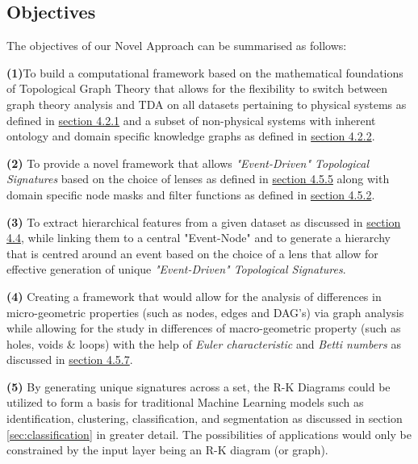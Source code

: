 \subsection{Objectives}

The objectives of our Novel Approach can be summarised as follows:

  \textbf{(1)}To build a computational framework based on the mathematical foundations of Topological Graph Theory that allows for the flexibility to switch between graph theory analysis and TDA on all datasets pertaining to physical systems as defined in  \hyperref[sec:PhysicalSystems]{section 4.2.1}  and a subset of non-physical systems with inherent ontology and domain specific knowledge graphs as defined in  \hyperref[sec:NonPhysical]{section 4.2.2}.
  
  \textbf{(2)} To provide a novel framework that allows \textit{"Event-Driven" Topological Signatures} based on the choice of  lenses  as defined in \hyperref[sec:sectionlens]{section 4.5.5} along with domain specific node masks and filter functions as defined in  \hyperref[sec:Filters]{section 4.5.2}.
  
  \textbf{(3)} To extract hierarchical features from a given dataset as discussed in \hyperref[sec:HEF]{section 4.4}, while linking them to a central "Event-Node" and to generate a hierarchy that is centred around an event based on the choice of a lens that allow for effective generation of unique \textit{"Event-Driven" Topological Signatures}.
  
  \textbf{(4)} Creating a framework that would allow for the analysis of differences in micro-geometric properties (such as nodes, edges and DAG's) via graph analysis while allowing for the study in differences of macro-geometric property (such as holes, voids \& loops) with the help of \textit{Euler characteristic} and \textit{Betti numbers} as discussed in \hyperref[sec:BettiNumber]{section 4.5.7}.
  
  \textbf{(5)} By generating unique signatures across a set, the R-K Diagrams could be utilized to form a basis for traditional Machine Learning models such as identification, clustering, classification, and segmentation as discussed in section \ref{sec:classification} in greater detail. The possibilities of applications would only be constrained by the input layer being an R-K diagram (or graph).
